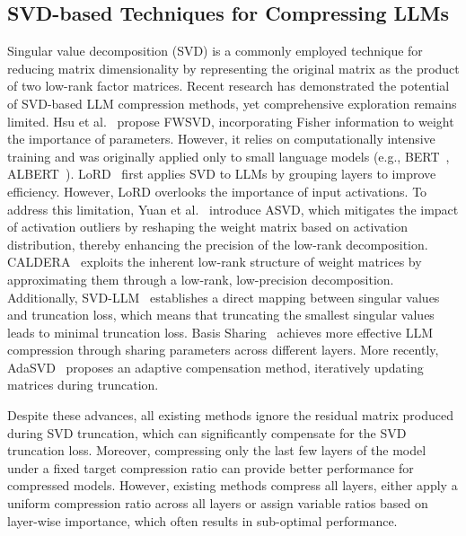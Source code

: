 \subsection{SVD-based Techniques for Compressing LLMs}
Singular value decomposition (SVD) is a commonly employed technique for reducing matrix dimensionality by representing the original matrix as the product of two low-rank factor matrices. 
Recent research has demonstrated the potential of SVD-based LLM compression methods, yet comprehensive exploration remains limited. 
Hsu et al.~\cite{hsulanguage} propose FWSVD, incorporating Fisher information to weight the importance of parameters. 
However, it relies on computationally intensive training and was originally applied only to small language models (e.g., BERT~\cite{devlin2019bert}, ALBERT~\cite{lan2019albert}). 
LoRD~\cite{kaushal2023lord} first applies SVD to LLMs by grouping layers to improve efficiency. 
However, LoRD overlooks the importance of input activations.
To address this limitation, Yuan et al.~\cite{yuan2023asvd} introduce ASVD, which mitigates the impact of activation outliers by reshaping the weight matrix based on activation distribution, thereby enhancing the precision of the low-rank decomposition. 
CALDERA~\cite{saha2024compressing} exploits the inherent low-rank structure of weight matrices by approximating them through a low-rank, low-precision decomposition.
Additionally, SVD-LLM~\cite{wang2024svd} establishes a direct mapping between singular values and truncation loss, which means that truncating the smallest singular values leads to minimal truncation loss.
Basis Sharing~\cite{wang2024basis} achieves more effective LLM compression through sharing parameters across different layers. 
More recently, AdaSVD~\cite{li2025adasvd} proposes an adaptive compensation method, iteratively updating matrices during truncation. 

Despite these advances, all existing methods ignore the residual matrix produced during SVD truncation, which can significantly compensate for the SVD truncation loss. 
Moreover, compressing only the last few layers of the model under a fixed target compression ratio can provide better performance for compressed models. 
However, existing methods compress all layers, either apply a uniform compression ratio across all layers or assign variable ratios based on layer-wise importance, which often results in sub-optimal performance.
